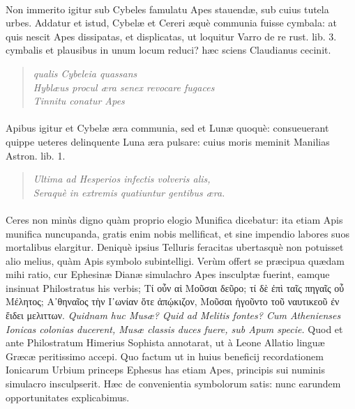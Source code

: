 \documentclass[a4paper, 11pt, oneside, polutonikogreek, latin]{article}
\begin{document}
\paragraph{}
Non immerito igitur sub Cybeles famulatu Apes stauendæ, sub cuius tutela urbes. Addatur et istud, Cybelæ et Cereri æquè communia fuisse cymbala: at quis nescit Apes dissipatas, et displicatas, ut loquitur Varro de re rust. lib. 3. cymbalis et plausibus in unum locum reduci? hæc sciens Claudianus cecinit.
\begin{quote}
\hspace*{15mm}\emph{qualis Cybeleia quassans}\\
\emph{Hyblæus procul æra senex revocare fugaces}\\
\emph{Tinnitu conatur Apes}\\
\end{quote}
\vspace*{-8mm}
\paragraph{}
Apibus igitur et Cybelæ æra communia, sed et Lunæ quoquè: consueuerant quippe ueteres delinquente Luna æra pulsare: cuius moris meminit Manilias Astron. lib. 1.
\begin{quote}
\emph{Ultima ad Hesperios infectis volveris alis,}\\
\emph{Seraquè in extremis quatiuntur gentibus æra.}\\
\end{quote}
\vspace*{-8mm}
\paragraph{}
Ceres non minùs digno quàm proprio elogio Munifica dicebatur: ita etiam Apis munifica nuncupanda, gratis enim nobis mellificat, et sine impendio labores suos mortalibus elargitur. Deniquè ipsius Telluris feracitas ubertasquè non potuisset alio melius, quàm Apis symbolo subintelligi. Verùm offert se præcipua quædam mihi ratio, cur Ephesinæ Dianæ simulachro Apes insculptæ fuerint, eamque insinuat Philostratus his verbis; Τί οὖν αἱ Μοῦσαι δεῦρο; τί δὲ ἐπὶ ταῖς πηγαῖς οὖ Μέλητος; Α᾽θηναῖος τὴν I᾽ωνίαν ὅτε ἀπῴκιζον, Μοῦσαι ἡγοῦντο τοῦ ναυτικεοῦ ἐν ἔιδει μελιττων. \emph{Quidnam huc Musæ? Quid ad Melitis fontes? Cum Athenienses Ionicas colonias ducerent, Musæ classis duces fuere, sub Apum specie.} Quod et ante Philostratum Himerius Sophista annotarat, ut à Leone Allatio linguæ Græcæ peritissimo accepi. Quo factum ut in huius beneficij recordationem Ionicarum Urbium princeps Ephesus has etiam Apes, principis sui numinis simulacro insculpserit. Hæc de convenientia symbolorum satis: nunc earundem opportunitates explicabimus.
\clearpage
\end{document}
